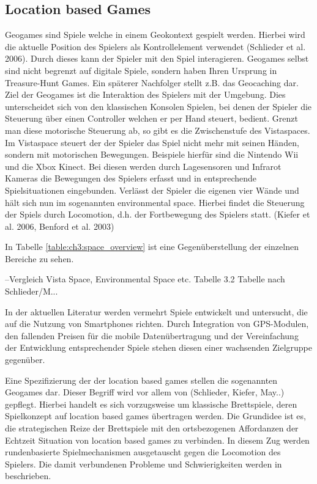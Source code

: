\subsection*{Location based Games}

Geogames sind Spiele welche in einem Geokontext gespielt werden. Hierbei wird die aktuelle Position des Spielers als Kontrollelement verwendet (Schlieder et al. 2006). Durch dieses kann der Spieler mit den Spiel interagieren.
Geogames selbst sind nicht begrenzt auf digitale Spiele, sondern haben Ihren Ursprung in Treasure-Hunt Games. Ein späterer Nachfolger stellt z.B. das Geocaching dar.
Ziel der Geogames ist die Interaktion des Spielers mit der Umgebung. Dies unterscheidet sich von den klassischen Konsolen Spielen, bei denen der Spieler die Steuerung über einen Controller welchen er per Hand steuert, bedient. Grenzt man diese motorische Steuerung ab, so gibt es die Zwischenstufe des Vistaspaces. Im Vistaspace steuert der der Spieler das Spiel nicht mehr mit seinen Händen, sondern mit motorischen Bewegungen. Beispiele hierfür sind die Nintendo Wii und die Xbox Kinect. Bei diesen werden durch Lagesensoren und Infrarot Kameras die Bewegungen des Spielers erfasst und in entsprechende Spielsituationen eingebunden.
Verlässt der Spieler die eigenen vier Wände und hält sich nun im sogenannten environmental space.
Hierbei findet die Steuerung der Spiels durch Locomotion, d.h. der Fortbewegung des Spielers statt. (Kiefer et al. 2006, Benford et al. 2003)

In Tabelle \ref{table:ch3:space_overview} ist eine Gegenüberstellung der einzelnen Bereiche zu sehen.

--Vergleich Vista Space, Environmental Space etc. Tabelle 3.2
Tabelle nach Schlieder/M...
\label{table:ch3:space_overview}

In der aktuellen Literatur werden vermehrt Spiele entwickelt und untersucht, die auf die Nutzung von Smartphones richten. \cite{Rashid.2006}
Durch Integration von GPS-Modulen, den fallenden Preisen für die mobile Datenübertragung und der Vereinfachung der Entwicklung entsprechender Spiele stehen diesen einer wachsenden Zielgruppe gegenüber.

Eine Spezifizierung der der location based games stellen die sogenannten Geogames dar. Dieser Begriff wird vor allem von (Schlieder, Kiefer, May..) gepflegt. Hierbei handelt es sich vorzugsweise um klassische Brettspiele, deren Spielkonzept auf location based games übertragen werden. Die Grundidee ist es, die strategischen Reize der Brettspiele mit den ortsbezogenen Affordanzen der Echtzeit Situation von location based games zu verbinden. In diesem Zug werden rundenbasierte Spielmechanismen ausgetauscht gegen die Locomotion des Spielers. Die damit verbundenen Probleme und Schwierigkeiten werden in \cite{Schlieder.2006} beschrieben.

